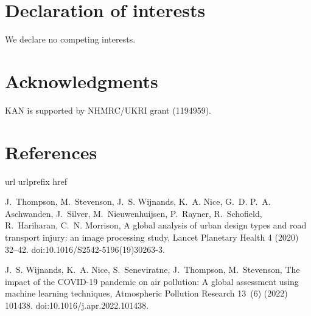 \documentclass[preprint,12pt]{elsarticle}
\begin{document}
\section*{Declaration of interests}\label{sec:dec}
We declare no competing interests.

\section*{Acknowledgments}\label{sec:ak}
KAN is supported by NHMRC/UKRI grant (1194959).







\section*{References}\label{sec:ref}




 
%
\begin{thebibliography}{1}
\expandafter\ifx\csname url\endcsname\relax
  \def\url#1{\texttt{#1}}\fi
\expandafter\ifx\csname urlprefix\endcsname\relax\def\urlprefix{URL }\fi
\expandafter\ifx\csname href\endcsname\relax
  \def\href#1#2{#2} \def\path#1{#1}\fi

J.~Thompson, M.~Stevenson, J.~S. Wijnands, K.~A. Nice, G.~D. P.~A. Aschwanden,
  J.~Silver, M.~Nieuwenhuijsen, P.~Rayner, R.~Schofield, R.~Hariharan, C.~N.
  Morrison, {A global analysis of urban design types and road transport injury:
  an image processing study}, Lancet Planetary Health 4 (2020) 32--42.
\newblock \href {https://doi.org/10.1016/S2542-5196(19)30263-3}
  {\path{doi:10.1016/S2542-5196(19)30263-3}}.

J.~S. Wijnands, K.~A. Nice, S.~Seneviratne, J.~Thompson, M.~Stevenson,
  \href{https://doi.org/10.1016/j.apr.2022.101438}{{The impact of the COVID-19
  pandemic on air pollution: A global assessment using machine learning
  techniques}}, Atmospheric Pollution Research 13~(6) (2022) 101438.
\newblock \href {https://doi.org/10.1016/j.apr.2022.101438}
  {\path{doi:10.1016/j.apr.2022.101438}}.


\end{thebibliography}
\end{document}
